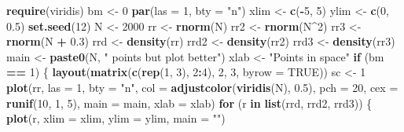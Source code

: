\documentclass[10,portrait]{article}
\newenvironment{Shaded}{\begin{snugshade}}{\end{snugshade}}
\newcommand{\KeywordTok}[1]{\textcolor[rgb]{0.13,0.29,0.53}{\textbf{#1}}}
\newcommand{\DataTypeTok}[1]{\textcolor[rgb]{0.13,0.29,0.53}{#1}}
\newcommand{\DecValTok}[1]{\textcolor[rgb]{0.00,0.00,0.81}{#1}}
\newcommand{\FloatTok}[1]{\textcolor[rgb]{0.00,0.00,0.81}{#1}}
\newcommand{\StringTok}[1]{\textcolor[rgb]{0.31,0.60,0.02}{#1}}
\newcommand{\OtherTok}[1]{\textcolor[rgb]{0.56,0.35,0.01}{#1}}
\newcommand{\ControlFlowTok}[1]{\textcolor[rgb]{0.13,0.29,0.53}{\textbf{#1}}}
\newcommand{\OperatorTok}[1]{\textcolor[rgb]{0.81,0.36,0.00}{\textbf{#1}}}
\newcommand{\NormalTok}[1]{#1}
\begin{document}
\begin{Shaded}
\begin{Highlighting}[]
\KeywordTok{require}\NormalTok{(viridis)}
\NormalTok{bm <-}\StringTok{ }\DecValTok{0}
\KeywordTok{par}\NormalTok{(}\DataTypeTok{las =} \DecValTok{1}\NormalTok{, }\DataTypeTok{bty =} \StringTok{"n"}\NormalTok{)}
\NormalTok{xlim <-}\StringTok{ }\KeywordTok{c}\NormalTok{(}\OperatorTok{-}\DecValTok{5}\NormalTok{, }\DecValTok{5}\NormalTok{)}
\NormalTok{ylim <-}\StringTok{ }\KeywordTok{c}\NormalTok{(}\DecValTok{0}\NormalTok{, }\FloatTok{0.5}\NormalTok{)}
\KeywordTok{set.seed}\NormalTok{(}\DecValTok{12}\NormalTok{)}
\NormalTok{N <-}\StringTok{ }\DecValTok{2000}
\NormalTok{rr <-}\StringTok{ }\KeywordTok{rnorm}\NormalTok{(N)}
\NormalTok{rr2 <-}\StringTok{ }\KeywordTok{rnorm}\NormalTok{(N}\OperatorTok{^}\DecValTok{2}\NormalTok{)}
\NormalTok{rr3 <-}\StringTok{ }\KeywordTok{rnorm}\NormalTok{(N }\OperatorTok{+}\StringTok{ }\FloatTok{0.3}\NormalTok{)}
\NormalTok{rrd <-}\StringTok{ }\KeywordTok{density}\NormalTok{(rr)}
\NormalTok{rrd2 <-}\StringTok{ }\KeywordTok{density}\NormalTok{(rr2)}
\NormalTok{rrd3 <-}\StringTok{ }\KeywordTok{density}\NormalTok{(rr3)}
\NormalTok{main <-}\StringTok{ }\KeywordTok{paste0}\NormalTok{(N, }\StringTok{" points but plot better"}\NormalTok{)}
\NormalTok{xlab <-}\StringTok{ "Points in space"}
\ControlFlowTok{if}\NormalTok{ (bm }\OperatorTok{==}\StringTok{ }\DecValTok{1}\NormalTok{) \{}
    \KeywordTok{layout}\NormalTok{(}\KeywordTok{matrix}\NormalTok{(}\KeywordTok{c}\NormalTok{(}\KeywordTok{rep}\NormalTok{(}\DecValTok{1}\NormalTok{, }\DecValTok{3}\NormalTok{), }\DecValTok{2}\OperatorTok{:}\DecValTok{4}\NormalTok{), }\DecValTok{2}\NormalTok{, }\DecValTok{3}\NormalTok{, }\DataTypeTok{byrow =} \OtherTok{TRUE}\NormalTok{))}
\NormalTok{    sc <-}\StringTok{ }\DecValTok{1}
    \KeywordTok{plot}\NormalTok{(rr, }\DataTypeTok{las =} \DecValTok{1}\NormalTok{, }\DataTypeTok{bty =} \StringTok{"n"}\NormalTok{, }\DataTypeTok{col =} \KeywordTok{adjustcolor}\NormalTok{(}\KeywordTok{viridis}\NormalTok{(N), }\FloatTok{0.5}\NormalTok{), }\DataTypeTok{pch =} \DecValTok{20}\NormalTok{, }\DataTypeTok{cex =} \KeywordTok{runif}\NormalTok{(}\DecValTok{10}\NormalTok{, }\DecValTok{1}\NormalTok{, }\DecValTok{5}\NormalTok{), }
        \DataTypeTok{main =}\NormalTok{ main, }\DataTypeTok{xlab =}\NormalTok{ xlab)}
    \ControlFlowTok{for}\NormalTok{ (r }\ControlFlowTok{in} \KeywordTok{list}\NormalTok{(rrd, rrd2, rrd3)) \{}
        \KeywordTok{plot}\NormalTok{(r, }\DataTypeTok{xlim =}\NormalTok{ xlim, }\DataTypeTok{ylim =}\NormalTok{ ylim, }\DataTypeTok{main =} \StringTok{""}\NormalTok{)}

\end{Highlighting}
\end{Shaded}
\end{document}
